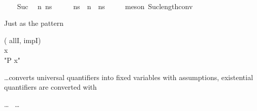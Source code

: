 \documentclass{beamer}
\begin{document}
\begin{frame}{\insertsubsectionhead\
    \textemdash\ \insertsubsubsectionhead}

  \begin{tcolorbox}
    \begin{isabellebody}
      \ \ \isamarkupfalse%
      \ Suc\ \isamarkupfalse%
      \ n\ ns{\isacharprime}\ \isanewline \ \ \ \ \
      {\isachardoublequoteopen}ns\ {\isacharequal}\ n\ {\isacharhash}\
      ns{\isacharprime}{\isachardoublequoteclose}\isanewline \ \ \ \
      \isamarkupfalse%
      \ {\isacharparenleft}meson\
      Suc{\isacharunderscore}length{\isacharunderscore}conv{\isacharparenright}
    \end{isabellebody}
  \end{tcolorbox}

  Just as the pattern

  \begin{isabelle}
     ( allI,  impI) \\
     x \\
     "P x"
  \end{isabelle}

  \ldots converts universal quantifiers into fixed variables with
  assumptions, existential quantifiers are converted with

  \begin{isabelle}
     \ldots\  \ldots
  \end{isabelle}

  \framebreak


\end{frame}
\end{document}
